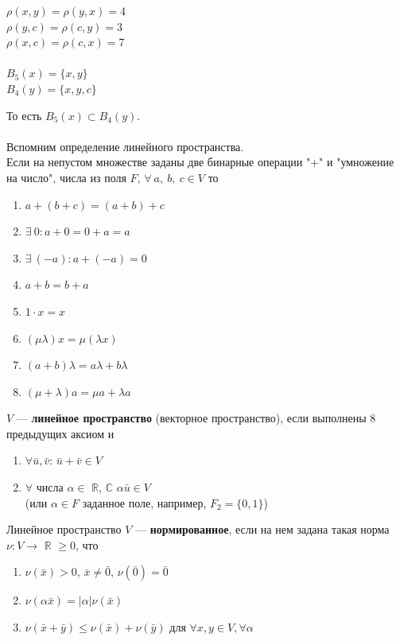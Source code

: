 \documentclass[a4paper,12pt]{article}
\begin{document}
\begin{defintion}
\begin{center}
	$\rho (x, y) = \rho(y, x) = 4$\\
	$\rho (y, c) = \rho(c, y) = 3$\\
	$\rho (x, c) = \rho(c, x) = 7$\\
	~\\
	$B_5(x) = \{ x, y \}$\\
	$B_4(y) = \{x, y, c \} $\end{center}
То есть $B_5(x) \subset B_4(y)$.\\
\\
Вспомним определение линейного пространства.\\
Если на непустом множестве заданы две бинарные операции "+" и "умножение на число", числа из поля $F$, $\forall ~a,~b,~c\in V$ то\begin{enumerate}
	\item $a+(b+c) = (a+b)+c$
	\item $\exists~0: a+0 = 0+a = a$
	\item $\exists~ (-a): a+(-a) = 0$
	\item $a+b = b+a$
	\item $1\cdot x = x$
	\item $ (\mu \lambda)x = \mu(\lambda x)$
	\item $(a+b)\lambda = a\lambda + b\lambda$
	\item $(\mu + \lambda)a = \mu a + \lambda a$
\end{enumerate}
$V$ --- \textbf{линейное пространство} (векторное пространство), если выполнены 8 предыдущих аксиом и \begin{enumerate}
	\item $\forall \bar u, \bar v$: $\bar u + \bar v \in V$
	\item $\forall$ числа $\alpha \in$ $\mathbb{R}$, $\mathbb{C}$ $\alpha \bar u \in V$\\ 
	(или $\alpha \in F$ заданное поле, например, $F_2 = \{ 0, 1 \}$)\end{enumerate}
Линейное пространство $V$ --- \textbf{нормированное}, если на нем задана такая норма \\$\nu : V \to$ $\mathbb{R}$ $\geqslant 0$, что\begin{enumerate}
	\item $\nu(\bar x) > 0$, $\bar x \neq \bar 0$, $\nu(\bar 0) = \bar 0$
	\item $\nu(\alpha \bar x) = |\alpha|\nu(\bar x)$
	\item $\nu(\bar x + \bar y) \leq \nu(\bar x) + \nu(\bar y)$ для $\forall x, y \in V, \forall \alpha$
\end{enumerate}

\end{defintion}
\end{document}
